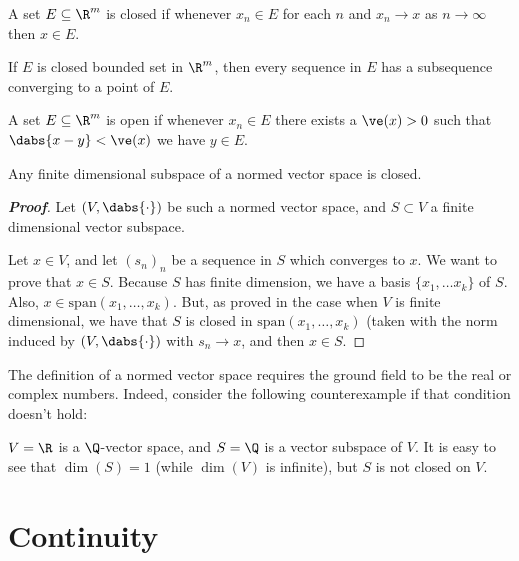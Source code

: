 \begin{definition}\label{def:closed_set}
A set $E \subseteq \R^m$ is closed if whenever $x_n \in E$ for each $n$ and $x_n \to x$ as $n\to \infty$ then $x\in E$.
\end{definition}

\begin{theorem}\label{thm:closed_set_subsequence}
If $E$ is closed bounded set in $\R^m$, then every sequence in $E$ has a subsequence converging to a point of $E$.
\end{theorem}

\begin{definition}\label{def:closed_set}
A set $E \subseteq \R^m$ is open if whenever $x_n \in E$ there exists a $\ve(x)>0$ such that $\dabs{x-y}<\ve(x)$ we have $y \in E$.
\end{definition}

\begin{theorem} Any finite dimensional subspace of a normed vector space is closed.
\end{theorem}
\begin{proof}[{\bf Proof}] Let $(V,\dabs{\cdot})$ be such a normed vector space, and $S\subset V$ a finite dimensional vector subspace.

Let $x\in V$, and let $(s_n)_n$ be a sequence in $S$ which converges to $x$. We want to prove that $x\in S$. Because $S$ has finite dimension, we have a basis $\{x_1,\dots x_k\}$ of $S$. Also, $x \in \text{span}(x_1,\dots, x_k)$. But, as proved in the case when $V$ is finite dimensional, we have that $S$ is closed in $\text{span}(x_1,\dots,x_k)$ (taken with the norm induced by $(V,\dabs{\cdot})$ with $s_n \to x$, and then $x\in S$.
\end{proof}

\begin{note}
The definition of a normed vector space requires the ground field to be the real or complex numbers. Indeed, consider the following counterexample if that condition doesn't hold:

$V=\R$ is a $\Q$-vector space, and $S=\Q$ is a vector subspace of $V$. It is easy to see that $\dim(S)=1$ (while $\dim(V)$ is infinite), but $S$ is not closed on $V$.
\end{note}


\section{Continuity}

